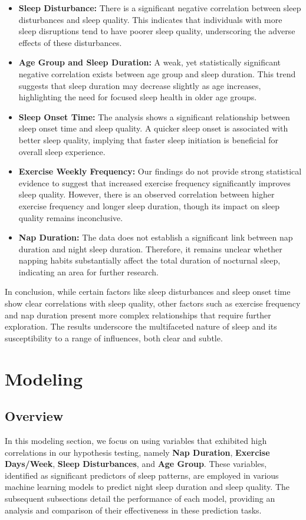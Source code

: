 \documentclass[conference]{IEEEtran}
\begin{document}
\begin{itemize}
    \item \textbf{Sleep Disturbance:} There is a significant negative correlation between sleep disturbances and sleep quality. This indicates that individuals with more sleep disruptions tend to have poorer sleep quality, underscoring the adverse effects of these disturbances.
    \item \textbf{Age Group and Sleep Duration:} A weak, yet statistically significant negative correlation exists between age group and sleep duration. This trend suggests that sleep duration may decrease slightly as age increases, highlighting the need for focused sleep health in older age groups.
    \item \textbf{Sleep Onset Time:} The analysis shows a significant relationship between sleep onset time and sleep quality. A quicker sleep onset is associated with better sleep quality, implying that faster sleep initiation is beneficial for overall sleep experience.
    \item \textbf{Exercise Weekly Frequency:} Our findings do not provide strong statistical evidence to suggest that increased exercise frequency significantly improves sleep quality. However, there is an observed correlation between higher exercise frequency and longer sleep duration, though its impact on sleep quality remains inconclusive.
    \item \textbf{Nap Duration:} The data does not establish a significant link between nap duration and night sleep duration. Therefore, it remains unclear whether napping habits substantially affect the total duration of nocturnal sleep, indicating an area for further research.
\end{itemize}

In conclusion, while certain factors like sleep disturbances and sleep onset time show clear correlations with sleep quality, other factors such as exercise frequency and nap duration present more complex relationships that require further exploration. The results underscore the multifaceted nature of sleep and its susceptibility to a range of influences, both clear and subtle.

\section{Modeling}

\subsection*{Overview}
In this modeling section, we focus on using variables that exhibited high correlations in our hypothesis testing, namely \textbf{Nap Duration}, \textbf{Exercise Days/Week}, \textbf{Sleep Disturbances}, and \textbf{Age Group}. These variables, identified as significant predictors of sleep patterns, are employed in various machine learning models to predict night sleep duration and sleep quality. The subsequent subsections detail the performance of each model, providing an analysis and comparison of their effectiveness in these prediction tasks.
\end{document}
